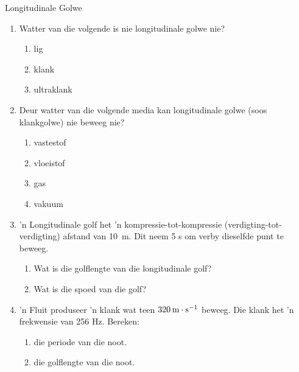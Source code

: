    \label{m38783*cid9}


\begin{eocexercises}{Longitudinale Golwe}
            \nopagebreak
\label{m38783*id293753}\begin{enumerate}[noitemsep, label=\textbf{\arabic*}. ] 
\item Watter van die volgende is nie longitudinale golwe nie?
\begin{enumerate}[noitemsep, label=\textbf{\alph*}. ] 
    \item lig
    \item klank
    \item ultraklank
\end{enumerate}
\item Deur watter van die volgende media kan longitudinale golwe (soos klankgolwe) nie beweeg nie?
\begin{enumerate}[noitemsep, label=\textbf{\alph*}. ] 
    \item vastestof
    \item vloeistof
    \item gas
    \item vakuum
\end{enumerate}

\par
\item 'n Longitudinale golf het 'n kompressie-tot-kompressie (verdigting-tot-verdigting) afstand van 10~m. Dit neem 5 s om verby dieselfde punt te beweeg.
\begin{enumerate}[noitemsep, label=\textbf{\alph*}. ] 
    \item Wat is die golflengte van die longitudinale golf?
    \item Wat is die spoed van die golf?
\end{enumerate}

\item 'n Fluit produseer 'n klank wat teen $320\phantom{\rule{2pt}{0ex}}\text{m}\ensuremath{\cdot}\text{s}{}^{-1}$ beweeg. Die klank het 'n frekwensie van 256 Hz. Bereken:
\begin{enumerate}[noitemsep, label=\textbf{\alph*}. ] 
    \item die periode van die noot.
    \item die golflengte van die noot.
\end{enumerate}
\end{enumerate}


\end{eocexercises}
